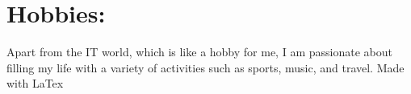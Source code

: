 \documentclass[a4paper,10pt]{article}
\begin{document}
\section*{Hobbies:}
\textnormal{Apart from the IT world, which is like a hobby for me, I am passionate about filling my life with a variety of activities such as sports, music, and travel.}
\mbox{}
\vfill
\textcopyright Made with LaTex \the\year{}
\end{document}
